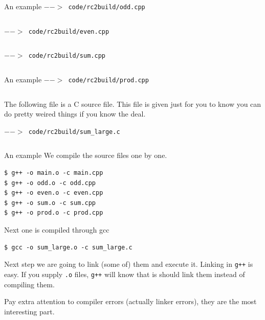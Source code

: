 \begin{frame}[fragile]{An example}
\vspace{0.04in}
\texttt{$-->$ code/rc2build/odd.cpp}
\inputminted{c++}{code/rc2build/odd.cpp}

\vspace{0.04in}
\texttt{$-->$ code/rc2build/even.cpp}
\inputminted{c++}{code/rc2build/even.cpp}

\vspace{0.04in}
\texttt{$-->$ code/rc2build/sum.cpp}
\inputminted{c++}{code/rc2build/sum.cpp}
\end{frame}

\begin{frame}[fragile]{An example}
\texttt{$-->$ code/rc2build/prod.cpp}
\inputminted{c++}{code/rc2build/prod.cpp}

\vspace{0.04in}
\begin{small}
	The following file is a C source file. This file is given just for you to know you can do pretty weired things if you know the deal.
\end{small}

\texttt{$-->$ code/rc2build/sum\_large.c}
\inputminted{c++}{code/rc2build/sum_large.c}

\end{frame}

\begin{frame}[fragile]{An example}
We compile the source files one by one. 
\begin{verbatim}
$ g++ -o main.o -c main.cpp
$ g++ -o odd.o -c odd.cpp
$ g++ -o even.o -c even.cpp
$ g++ -o sum.o -c sum.cpp
$ g++ -o prod.o -c prod.cpp
\end{verbatim}
Next one is compiled through gcc
\begin{verbatim}
$ gcc -o sum_large.o -c sum_large.c
\end{verbatim}

Next step we are going to link (some of) them and execute it. Linking in \texttt{g++} is easy. If you supply \texttt{.o} files, \texttt{g++} will know that is should link them instead of compiling them.

Pay extra attention to compiler errors (actually linker errors), they are the most interesting part.

\end{frame}

